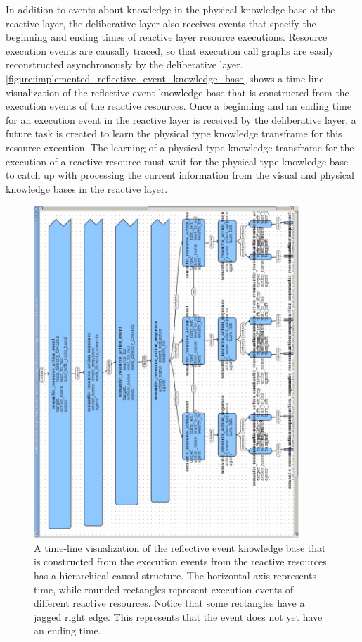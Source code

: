 In addition to events about knowledge in the physical knowledge base
of the reactive layer, the deliberative layer also receives events
that specify the beginning and ending times of reactive layer resource
executions.  Resource execution events are causally traced, so that
execution call graphs are easily reconstructed asynchronously by the
deliberative layer.
{\mbox{\autoref{figure:implemented_reflective_event_knowledge_base}}}
shows a time-line visualization of the reflective event knowledge base
that is constructed from the execution events of the reactive
resources.  Once a beginning and an ending time for an execution event
in the reactive layer is received by the deliberative layer, a future
task is created to learn the physical type knowledge transframe for
this resource execution.  The learning of a physical type knowledge
transframe for the execution of a reactive resource must wait for the
physical type knowledge base to catch up with processing the current
information from the visual and physical knowledge bases in the
reactive layer.
\begin{figure}
\begin{center}
\includegraphics[width=10cm]{gfx/implemented_reflective_event_knowledge_base}
\end{center}
\caption[A time-line visualization of the reflective event knowledge
  base that is constructed from the execution events from the reactive
  resources.]{A time-line visualization of the reflective event
  knowledge base that is constructed from the execution events from
  the reactive resources has a hierarchical causal structure.  The
  horizontal axis represents time, while rounded rectangles represent
  execution events of different reactive resources.  Notice that some
  rectangles have a jagged right edge.  This represents that the event
  does not yet have an ending time.}
\label{figure:physical_type_knowledge_abstraction}
\end{figure}

